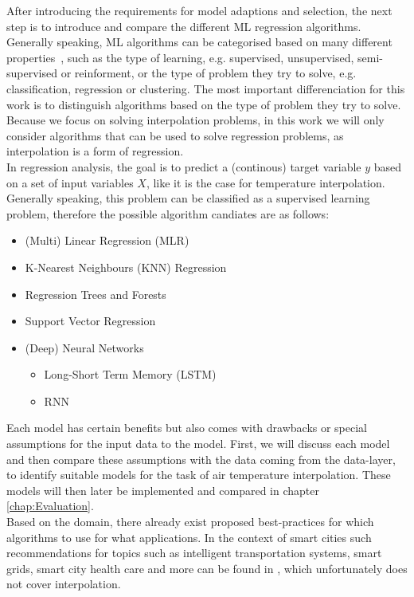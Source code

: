 After introducing the requirements for model adaptions and selection, the next step is to introduce and compare the different ML regression algorithms.
Generally speaking, ML algorithms can be categorised based on many different properties~\cite{sarker2021machine}, such as the type of learning, e.g. supervised, unsupervised, semi-supervised or reinforment, or the type of problem they try to solve, e.g. classification, regression or clustering. The most important differenciation for this work is to distinguish algorithms based on the type of problem they try to solve. Because we focus on solving interpolation problems, in this work we will only consider algorithms that can be used to solve regression problems, as interpolation is a form of regression.\\
In regression analysis, the goal is to predict a (continous) target variable $y$ based on a set of input variables $X$, like it is the case for temperature interpolation. Generally speaking, this problem can be classified as a supervised learning problem, therefore the possible algorithm candiates are as follows:

\begin{itemize}
    \item (Multi) Linear Regression (MLR)
    \item K-Nearest Neighbours (KNN) Regression
    \item Regression Trees and Forests
    \item Support Vector Regression
    \item (Deep) Neural Networks

    \begin{itemize}
        \item Long-Short Term Memory (LSTM)
        \item RNN
    \end{itemize}
\end{itemize}

Each model has certain benefits but also comes with drawbacks or special assumptions for the input data to the model. First, we will discuss each model and then compare these assumptions with the data coming from the data-layer, to identify suitable models for the task of air temperature interpolation. These models will then later be implemented and compared in chapter \ref{chap:Evaluation}.\\
Based on the domain, there already exist proposed best-practices for which algorithms to use for what applications. In the context of smart cities such recommendations for topics such as intelligent transportation systems, smart grids, smart city health care and more can be found in \cite{ullah2020applications}, which unfortunately does not cover interpolation.

